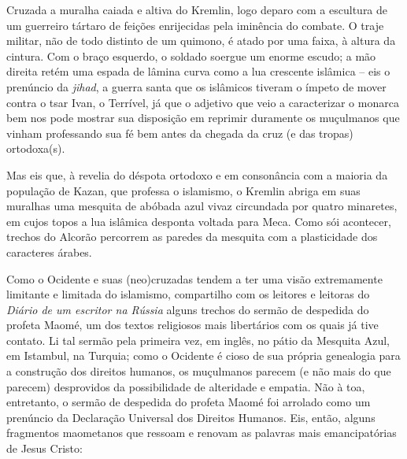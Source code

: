 Cruzada a muralha caiada e altiva do Kremlin, logo deparo com a
escultura de um guerreiro tártaro de feições enrijecidas pela iminência
do combate. O traje militar, não de todo distinto de um quimono, é atado
por uma faixa, à altura da cintura. Com o braço esquerdo, o soldado
soergue um enorme escudo; a mão direita retém uma espada de lâmina curva
como a lua crescente islâmica -- eis o prenúncio da \emph{jihad}, a
guerra santa que os islâmicos tiveram o ímpeto de mover contra o tsar
Ivan, o Terrível, já que o adjetivo que veio a caracterizar o monarca
bem nos pode mostrar sua disposição em reprimir duramente os muçulmanos
que vinham professando sua fé bem antes da chegada da cruz (e das
tropas) ortodoxa(s).

Mas eis que, à revelia do déspota ortodoxo e em consonância com a
maioria da população de Kazan, que professa o islamismo, o Kremlin
abriga em suas muralhas uma mesquita de abóbada azul vivaz circundada
por quatro minaretes, em cujos topos a lua islâmica desponta voltada
para Meca. Como sói acontecer, trechos do Alcorão percorrem as paredes
da mesquita com a plasticidade dos caracteres árabes.

Como o Ocidente e suas (neo)cruzadas tendem a ter uma visão extremamente
limitante e limitada do islamismo, compartilho com os leitores e
leitoras do \emph{Diário de um escritor na Rússia} alguns trechos do
sermão de despedida do profeta Maomé, um dos textos religiosos mais
libertários com os quais já tive contato. Li tal sermão pela primeira
vez, em inglês, no pátio da Mesquita Azul, em Istambul, na Turquia; como
o Ocidente é cioso de sua própria genealogia para a construção dos
direitos humanos, os muçulmanos parecem (e não mais do que parecem)
desprovidos da possibilidade de alteridade e empatia. Não à toa,
entretanto, o sermão de despedida do profeta Maomé foi arrolado como um
prenúncio da Declaração Universal dos Direitos Humanos. Eis, então,
alguns fragmentos maometanos que ressoam e renovam as palavras mais
emancipatórias de Jesus Cristo:

